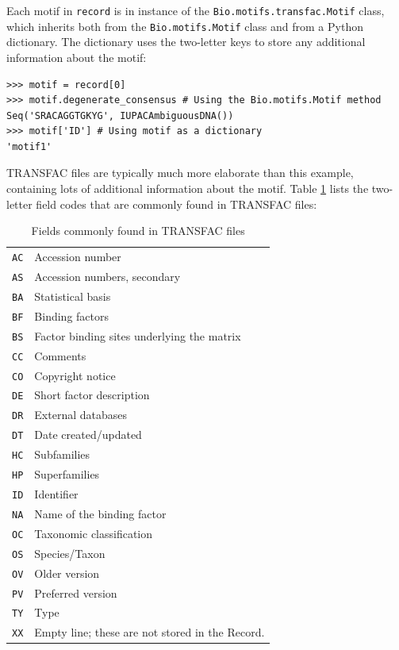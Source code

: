 \documentclass{report}
\begin{document}
Each motif in \verb+record+ is in instance of the \verb+Bio.motifs.transfac.Motif+
class, which inherits both from the \verb+Bio.motifs.Motif+ class and
from a Python dictionary. The dictionary uses the two-letter keys to
store any additional information about the motif:
\begin{verbatim}
>>> motif = record[0]
>>> motif.degenerate_consensus # Using the Bio.motifs.Motif method
Seq('SRACAGGTGKYG', IUPACAmbiguousDNA())
>>> motif['ID'] # Using motif as a dictionary
'motif1'
\end{verbatim}

TRANSFAC files are typically much more elaborate than this example, containing
lots of additional information about the motif. Table \ref{table:transfaccodes}
lists the two-letter field codes that are commonly found in TRANSFAC files:
\begin{table}[h]
\label{table:transfaccodes}
\begin{center}
\caption{Fields commonly found in TRANSFAC files}
\begin{tabular}{|l|l||}
\verb+AC+ & Accession number \\
\verb+AS+ & Accession numbers, secondary \\
\verb+BA+ & Statistical basis \\
\verb+BF+ & Binding factors \\
\verb+BS+ & Factor binding sites underlying the matrix \\
\verb+CC+ & Comments \\
\verb+CO+ & Copyright notice \\
\verb+DE+ & Short factor description \\
\verb+DR+ & External databases \\
\verb+DT+ & Date created/updated \\
\verb+HC+ & Subfamilies \\
\verb+HP+ & Superfamilies \\
\verb+ID+ & Identifier \\
\verb+NA+ & Name of the binding factor \\
\verb+OC+ & Taxonomic classification \\
\verb+OS+ & Species/Taxon \\
\verb+OV+ & Older version \\
\verb+PV+ & Preferred version \\
\verb+TY+ & Type \\
\verb+XX+ & Empty line; these are not stored in the Record. \\
\end{tabular}
\end{center}
\end{table}
\end{document}
